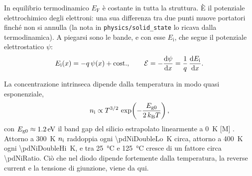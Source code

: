 \documentclass[10pt,a4paper]{scrartcl}
\let\newcommand\pdvaluedefine
\newcommand{\diff}{\mathrm{d}}
\newcommand{\Ef}{\mathcal{E}}                 %
\newcommand{\nint}{n_\mathrm{i}}
\newcommand{\kB}{k_\mathrm{B}}
\begin{document}
In equilibrio termodinamico $E_\mathrm{F}$ è costante in tutta la struttura. È il potenziale elettrochimico degli elettroni: una sua differenza tra due punti muove portatori finché non si annulla (la nota in \texttt{physics/solid\_state} lo ricava dalla termodinamica). A piegarsi sono le bande, e con esse $E_\mathrm{i}$, che segue il potenziale elettrostatico $\psi$:
\begin{equation}
E_\mathrm{i}(x) = -q\,\psi(x) + \text{cost.} , \qquad \Ef = -\frac{\diff\psi}{\diff x} = \frac{1}{q}\,\frac{\diff E_\mathrm{i}}{\diff x} .
\label{eq:potential}
\end{equation}

La concentrazione intrinseca dipende dalla temperatura in modo quasi esponenziale,
\begin{equation}
\nint \propto T^{3/2}\,\exp\!\left(-\frac{E_\mathrm{g0}}{2\,\kB T}\right) ,
\label{eq:ni}
\end{equation}
con $E_\mathrm{g0} \approx \SI{1.2}{\electronvolt}$ il band gap del silicio estrapolato linearmente a \SI{0}{\kelvin} [M] \cite{sze}. Attorno a \SI{300}{\kelvin} $\nint$ raddoppia ogni \SI{\pdNiDoubleLo}{\kelvin} circa, attorno a \SI{400}{\kelvin} ogni \SI{\pdNiDoubleHi}{\kelvin}, e tra \SI{25}{\celsius} e \SI{125}{\celsius} cresce di un fattore circa \num{\pdNiRatio}. Ciò che nel diodo dipende fortemente dalla temperatura, la reverse current e la tensione di giunzione, viene da qui.
\end{document}
